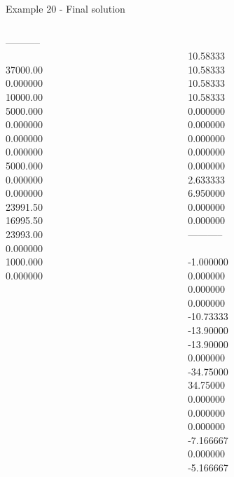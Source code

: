 \begin{frame}{Example 20 - Final solution}
\begin{columns}[t]
\begin{column}{0.3\textwidth}
-----------\\
\\
37000.00\\
0.000000\\
10000.00\\
5000.000\\
0.000000\\
0.000000\\
0.000000\\
5000.000\\
0.000000\\
0.000000\\
23991.50\\
16995.50\\
23993.00\\
0.000000\\
1000.000\\
0.000000\\


\end{column}  

\begin{column}{0.3\textwidth}
\\
10.58333\\
10.58333\\
10.58333\\
10.58333\\
0.000000\\
0.000000\\
0.000000\\
0.000000\\
0.000000\\
2.633333\\
6.950000\\
0.000000\\
0.000000\\

-----------\\
\\
-1.000000\\
0.000000\\
0.000000\\
0.000000\\
-10.73333\\
-13.90000\\
-13.90000\\
0.000000\\
-34.75000\\
34.75000\\
0.000000\\
0.000000\\
0.000000\\
-7.166667\\
0.000000\\
-5.166667\\

\end{column}
\end{columns}
\end{frame}
